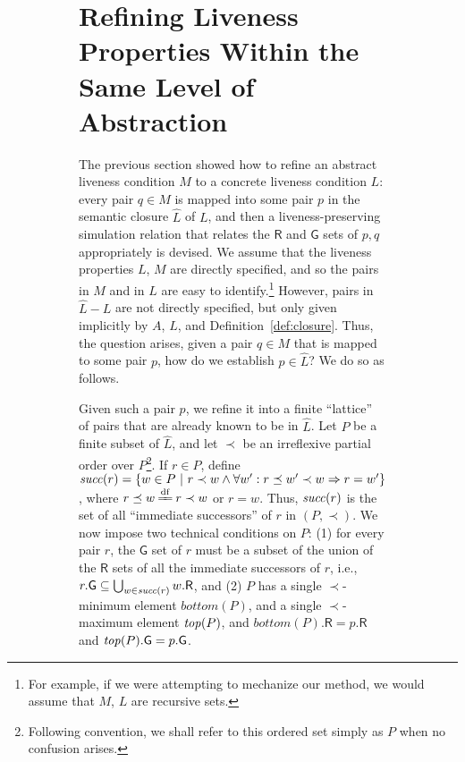 \documentclass[11pt]{article}
\newcommand{\UN}{\bigcup}
\newcommand{\fa}{\forall}
\newcommand{\G}{\mathsf{G}}
\newcommand{\R}{\mathsf{R}}
\newcommand{\bottom}{\mathit{bottom}}
\newcommand{\clos}[1]{\widehat{{#1}}}	\newcommand{\esig}{\mathit{esig}}
\newcommand{\lprec}{\prec}
\newcommand{\lpreceq}{\preceq}
\begin{document}
\begin{figure}[htb]
\begin{figure}[htb]
\section{Refining Liveness Properties Within the Same Level of Abstraction}
\label{sec:lattices}

The previous section showed how to refine an abstract liveness
condition $M$ to a concrete liveness condition $L$: every pair $q \in M$ is
mapped into some pair $p$ in the semantic closure $\clos{L}$ of $L$, and
then a liveness-preserving simulation relation that relates the
$\R$ and $\G$ sets of $p, q$ appropriately is devised.
We assume that the liveness properties $L$, $M$ are directly
specified, and so the pairs in $M$ and in $L$ are easy to
identify.\footnote{For example, if we were attempting to mechanize our
method, we would assume that $M$, $L$ are recursive sets.}
However, pairs in $\clos{L} - L$ are not directly specified, but only
given implicitly by $A$, $L$, and Definition~\ref{def:closure}.
Thus, the question arises, given a pair $q \in M$ that is mapped to
some pair $p$, how do we establish $p \in \clos{L}$?
We do so as follows.





Given such a pair $p$, we refine it 
 into a finite ``lattice'' of
pairs that are already known to be in $\clos{L}$. Let $P$ be a finite subset of
$\clos{L}$, and let $\lprec$ be an irreflexive partial order
over $P$\footnote{Following convention, we shall refer to this
ordered set simply as $P$ when no confusion arises.}. If $r \in P$, define
$\suc(r) = \{w \in P ~|~ r \lprec w \land \fa w': r \lpreceq w' \lprec w \imp
r = w' \}$, where $r \lpreceq w \df r \lprec w$ or $r = w$.
Thus, $\mathit{succ}(r)$ is the set of all ``immediate successors''
of $r$ in $(P,\lprec)$. 
We now impose two technical conditions on $P$:
(1) for every pair $r$, the $\G$ set of $r$ must be a subset of the
union of the $\R$ sets of all the immediate successors of $r$,
i.e., $r.\G \sub \UN_{w \in \suc(r)} w.\R$, 
and
(2) $P$ has a single $\lprec$-minimum element $\bottom(P)$, and a
single $\lprec$-maximum element $\mathit{top}(P)$, and $\bottom(P).\R = p.\R$ and
$\topp(P).\G = p.\G$.


\end{figure}
\end{figure}
\end{document}
